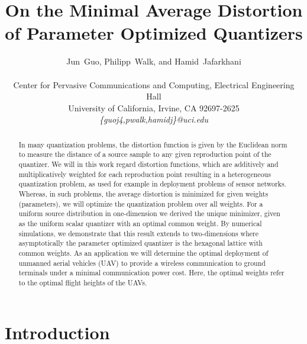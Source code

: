\documentclass[smallabstract,smallcaptions]{dccpaper}
\newcounter{example}[section]
\begin{document}
%
\title{On the Minimal Average Distortion of Parameter Optimized Quantizers}



\author{Jun~Guo, Philipp~Walk, and Hamid~Jafarkhani\\
  {\small\hspace{-0.5cm}\begin{minipage}{\textwidth}
\begin{tabular}{c}
Center for Pervasive Communications and Computing, Electrical Engineering Hall  \\
University of California, Irvine, CA 92697-2625 \\
{\it\{guoj4,pwalk,hamidj\}@uci.edu}
\end{tabular}
\end{minipage}}
}

\maketitle
\begin{abstract}
  In many quantization problems, the distortion function is given by the Euclidean norm to measure the distance of a
  source sample to any given reproduction point of the quantizer. We will in this work regard distortion functions,
  which are additively and multiplicatively weighted for each reproduction point resulting in a heterogeneous quantization problem, as
  used for example in deployment problems of sensor networks. Whereas, in such problems, the average distortion is
  minimized for given weights (parameters), we will optimize the quantization problem over all weights.  For a uniform source
  distribution in one-dimension we derived the unique minimizer, given as the uniform scalar quantizer with an optimal
  common weight. By numerical simulations, we demonstrate that this result extends to two-dimensions where
  asymptotically the parameter optimized quantizer is the hexagonal lattice with common weights. As an application we
  will determine the optimal deployment of unmanned aerial vehicles (UAV) to provide a wireless communication to ground
  terminals under a minimal communication power cost. Here, the optimal weights refer to the optimal flight heights of the
  UAVs.
\end{abstract}
%
\section{Introduction}
\end{document}
